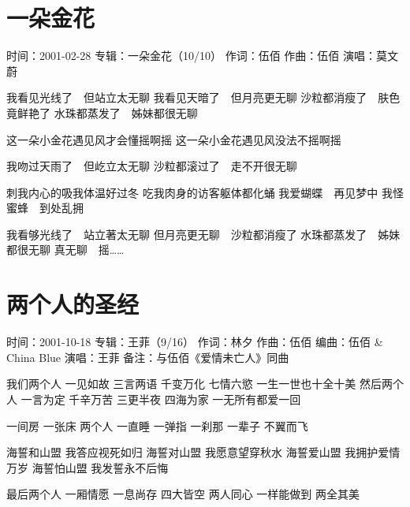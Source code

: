 \documentclass[UTF8,a4paper,oneside,twocolumn,12pt]{ctexbook}
\newcommand{\infopair}[2]{\textbullet #1：#2}
\newcommand{\zc}[1][伍佰]{\infopair{作词}{#1}}
\newcommand{\zq}[1][伍佰]{\infopair{作曲}{#1}}
\newcommand{\bq}[1][伍佰]{\infopair{编曲}{#1}}
\newcommand{\zj}[1]{\infopair{专辑}{#1}}
\newcommand{\sj}[1]{\infopair{时间}{#1}}
\newcommand{\bz}[1]{\infopair{备注}{#1}}
\newenvironment{info}{\begin{flushleft}\kaishu
	}
	{\end{flushleft}\normalsize\yahei\par}
\newenvironment{lyric}{
	}
{}
\begin{document}
\section{一朵金花}
\begin{info}
	\sj{2001-02-28}
	\zj{一朵金花（10/10）}
	\zc
	\zq
	\infopair{演唱}{莫文蔚}
\end{info}
\begin{lyric}
	我看见光线了　但站立太无聊
	我看见天暗了　但月亮更无聊
	沙粒都消瘦了　肤色竟鲜艳了
	水珠都蒸发了　姊妹都很无聊

	这一朵小金花遇见风才会懂摇啊摇
	这一朵小金花遇见风没法不摇啊摇

	我吻过天雨了　但屹立太无聊
	沙粒都滚过了　走不开很无聊

	刺我内心的吸我体温好过冬
	吃我肉身的访客躯体都化蛹
	我爱蝴蝶　再见梦中
	我怪蜜蜂　到处乱拥

	我看够光线了　站立著太无聊
	但月亮更无聊　沙粒都消瘦了
	水珠都蒸发了　姊妹都很无聊
	真无聊　摇……
\end{lyric}

\section{两个人的圣经}
\begin{info}
	\sj{2001-10-18}
	\zj{王菲（9/16）}
	\zc[林夕]
	\zq
	\bq[伍佰 \& China Blue]
	\infopair{演唱}{王菲}
	\bz{与伍佰《爱情未亡人》同曲}
\end{info}
\begin{lyric}
	我们两个人 一见如故 三言两语
	千变万化 七情六慾 一生一世也十全十美
	然后两个人 一言为定 千辛万苦
	三更半夜 四海为家 一无所有都爱一回

	一间房 一张床 两个人 一直睡
	一弹指 一刹那 一辈子 不翼而飞

	海誓和山盟 我答应视死如归
	海誓对山盟 我愿意望穿秋水
	海誓爱山盟 我拥护爱情万岁
	海誓怕山盟 我发誓永不后悔

	最后两个人 一厢情愿 一息尚存
	四大皆空 两人同心 一样能做到 两全其美
\end{lyric}
\end{document}
